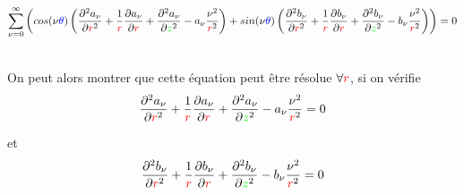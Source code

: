 \documentclass{report}
\begin{document}
\[
\sum\limits_{\nu =0}^{\infty} \left(cos(\nu {\color{blue}\theta}) \left(\frac{\partial^{2} a_\nu}{\partial {\color{red}r}^2} + \frac{1}{{\color{red}r}} 
\frac{\partial a_\nu}{\partial {\color{red}r}} + \frac{\partial^{2} a_\nu}{\partial {\color{green}z}^2} - a_\nu \frac{\nu ^2}{{\color{red}r}^2}\right) 
+ sin(\nu {\color{blue}\theta}) \left(\frac{\partial^{2} b_\nu}{\partial {\color{red}r}^2} + \frac{1}{{\color{red}r}} \frac{\partial b_\nu}{\partial {\color{red}r}} 
+ \frac{\partial^{2} b_\nu}{\partial {\color{green}z}^2}- b_\nu \frac{\nu ^2}{{\color{red}r}^2}\right)\right) = 0
\]

\
\\
On peut alors montrer que cette équation peut être résolue $\forall {\color{red}r}$, si on vérifie
\[
\frac{\partial^{2} a_\nu}{\partial {\color{red}r}^2} + \frac{1}{{\color{red}r}} 
\frac{\partial a_\nu}{\partial {\color{red}r}} + \frac{\partial^{2} a_\nu}{\partial {\color{green}z}^2} - a_\nu \frac{\nu ^2}{{\color{red}r}^2}=0
\]

et 
\[
\frac{\partial^{2} b_\nu}{\partial {\color{red}r}^2} + \frac{1}{{\color{red}r}} \frac{\partial b_\nu}{\partial {\color{red}r}} 
+ \frac{\partial^{2} b_\nu}{\partial {\color{green}z}^2}- b_\nu \frac{\nu ^2}{{\color{red}r}^2}=0 
\]
\end{document}
